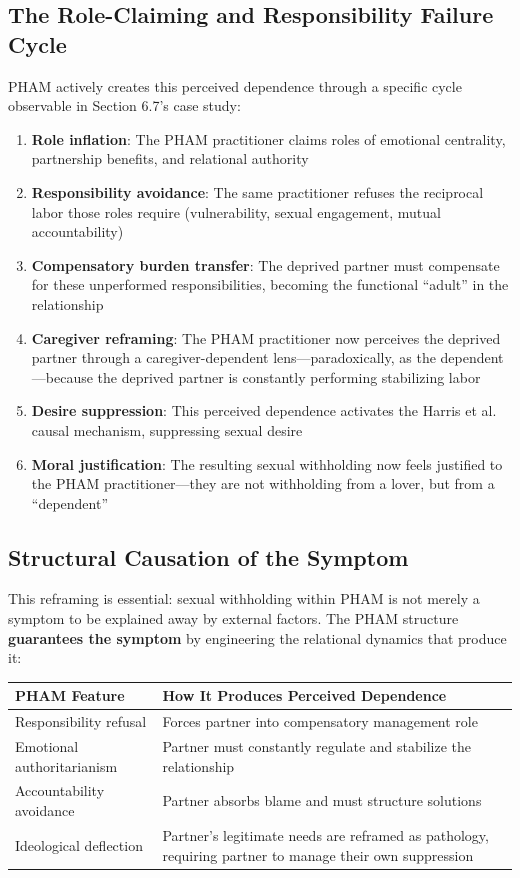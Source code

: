 \documentclass[12pt,openany]{book}
\numberwithin{equation}{chapter}
\begin{document}
\subsection{The Role-Claiming and Responsibility Failure Cycle}

PHAM actively creates this perceived dependence through a specific cycle observable in Section 6.7's case study:

\begin{enumerate}
    \item \textbf{Role inflation}: The PHAM practitioner claims roles of emotional centrality, partnership benefits, and relational authority
    \item \textbf{Responsibility avoidance}: The same practitioner refuses the reciprocal labor those roles require (vulnerability, sexual engagement, mutual accountability)
    \item \textbf{Compensatory burden transfer}: The deprived partner must compensate for these unperformed responsibilities, becoming the functional ``adult'' in the relationship
    \item \textbf{Caregiver reframing}: The PHAM practitioner now perceives the deprived partner through a caregiver-dependent lens---paradoxically, as the dependent---because the deprived partner is constantly performing stabilizing labor
    \item \textbf{Desire suppression}: This perceived dependence activates the Harris et al. causal mechanism, suppressing sexual desire
    \item \textbf{Moral justification}: The resulting sexual withholding now feels justified to the PHAM practitioner---they are not withholding from a lover, but from a ``dependent''
\end{enumerate}

\subsection{Structural Causation of the Symptom}

This reframing is essential: sexual withholding within PHAM is not merely a symptom to be explained away by external factors. The PHAM structure \textbf{guarantees the symptom} by engineering the relational dynamics that produce it:

\begin{center}
\begin{tabular}{|p{2.2in}|p{3in}|}
\hline
\textbf{PHAM Feature} & \textbf{How It Produces Perceived Dependence} \\
\hline
Responsibility refusal & Forces partner into compensatory management role \\
\hline
Emotional authoritarianism & Partner must constantly regulate and stabilize the relationship \\
\hline
Accountability avoidance & Partner absorbs blame and must structure solutions \\
\hline
Ideological deflection & Partner's legitimate needs are reframed as pathology, requiring partner to manage their own suppression \\
\hline
\end{tabular}
\end{center}
\end{document}
